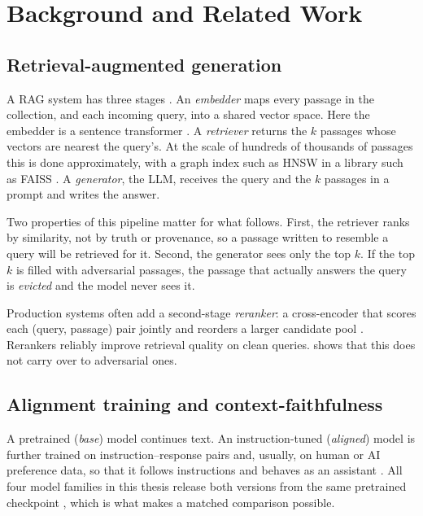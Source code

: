 \chapter{Background and Related Work}
\label{ch:background}

\section{Retrieval-augmented generation}
\label{sec:bg-rag}

A RAG system has three stages \cite{lewis2020rag}. An \emph{embedder} maps
every passage in the collection, and each incoming query, into a shared vector
space. Here the embedder is a sentence transformer \cite{reimers2019sbert}. A
\emph{retriever} returns the $k$ passages whose vectors are nearest the
query's. At the scale of hundreds of thousands of passages this is done
approximately, with a graph index such as HNSW \cite{malkov2020hnsw} in a
library such as FAISS \cite{johnson2019faiss}. A \emph{generator}, the LLM,
receives the query and the $k$ passages in a prompt and writes the answer.

Two properties of this pipeline matter for what follows. First, the retriever
ranks by similarity, not by truth or provenance, so a passage written to
resemble a query will be retrieved for it. Second, the generator sees only the
top $k$. If the top $k$ is filled with adversarial passages, the passage that
actually answers the query is \emph{evicted} and the model never sees it.

Production systems often add a second-stage \emph{reranker}: a cross-encoder
that scores each (query, passage) pair jointly and reorders a larger candidate
pool \cite{nogueira2019rerank}. Rerankers reliably improve retrieval quality
on clean queries.  shows that this does not carry over to
adversarial ones.

\section{Alignment training and context-faithfulness}
\label{sec:bg-alignment}

A pretrained (\emph{base}) model continues text. An instruction-tuned
(\emph{aligned}) model is further trained on instruction--response pairs and,
usually, on human or AI preference data, so that it follows instructions and
behaves as an assistant \cite{wei2022flan,ouyang2022instructgpt}. All four
model families in this thesis release both versions from the same pretrained
checkpoint \cite{grattafiori2024llama3,qwen2025qwen25,jiang2023mistral}, which
is what makes a matched comparison possible.

